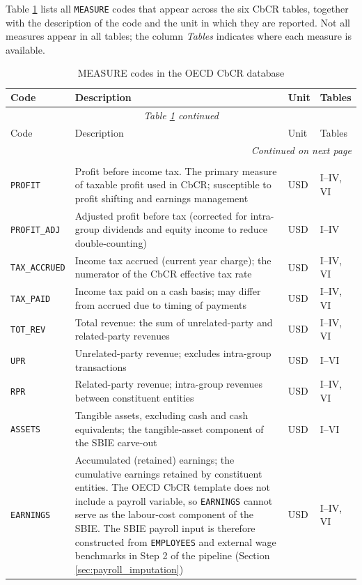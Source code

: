 \documentclass[11pt,a4paper]{article}
\newcommand{\code}[1]{\texttt{#1}}
\begin{document}
Table \ref{tab:measures} lists all \code{MEASURE} codes that appear across the six CbCR tables, together with the description of the code and the unit in which they are reported. Not all measures appear in all tables; the column \emph{Tables} indicates where each measure is available.

\begin{longtable}{@{}lp{6cm}lp{2.5cm}@{}}
\caption{MEASURE codes in the OECD CbCR database}\label{tab:measures}\\
\toprule
Code & Description & Unit & Tables \\
\midrule
\endfirsthead
\multicolumn{4}{c}{\textit{Table \ref{tab:measures} continued}}\\
\toprule
Code & Description & Unit & Tables \\
\midrule
\endhead
\midrule
\multicolumn{4}{r}{\textit{Continued on next page}}\\
\endfoot
\bottomrule
\endlastfoot
\multicolumn{4}{l}{\textit{Financial aggregates}}\\
\code{PROFIT} & Profit before income tax. The primary measure of taxable profit used in CbCR; susceptible to profit shifting and earnings management & USD & I--IV, VI \\
\code{PROFIT\_ADJ} & Adjusted profit before tax (corrected for intra-group dividends and equity income to reduce double-counting) & USD & I--IV \\
\code{TAX\_ACCRUED} & Income tax accrued (current year charge); the numerator of the CbCR effective tax rate & USD & I--IV, VI \\
\code{TAX\_PAID}  & Income tax paid on a cash basis; may differ from accrued due to timing of payments & USD & I--IV, VI \\
\code{TOT\_REV}  & Total revenue: the sum of unrelated-party and related-party revenues & USD & I--IV, VI \\
\code{UPR}   & Unrelated-party revenue; excludes intra-group transactions & USD & I--VI \\
\code{RPR}   & Related-party revenue; intra-group revenues between constituent entities & USD & I--IV, VI \\
\code{ASSETS}   & Tangible assets, excluding cash and cash equivalents; the tangible-asset component of the SBIE carve-out & USD & I--VI \\
\code{EARNINGS}  & Accumulated (retained) earnings; the cumulative earnings retained by constituent entities. The OECD CbCR template does not include a payroll variable, so \code{EARNINGS} cannot serve as the labour-cost component of the SBIE. The SBIE payroll input is therefore constructed from \code{EMPLOYEES} and external wage benchmarks in Step 2 of the pipeline (Section \ref{sec:payroll_imputation}) & USD & I--IV, VI \\

\end{longtable}
\end{document}
